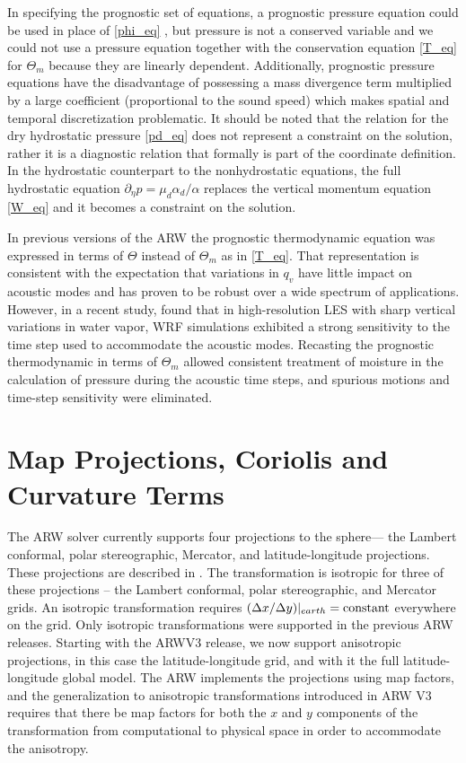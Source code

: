 In specifying the prognostic set of equations, a prognostic pressure equation could be used in
place of \eqref{phi_eq} \citep[see][]{laprise92}, but pressure is
not a conserved variable and we could not use a pressure equation
together with
the conservation equation \eqref{T_eq} for $\Theta_m$  because
they are linearly dependent.  
Additionally, prognostic pressure
equations have the disadvantage of possessing a mass divergence term
multiplied by a large coefficient (proportional to the sound speed)
which makes spatial and temporal discretization problematic.
It should be noted that the relation for the dry hydrostatic pressure
\eqref{pd_eq} does not represent a constraint on
the solution, rather it is a diagnostic relation that formally is part
of the coordinate definition.  In the hydrostatic counterpart to the
nonhydrostatic equations, the full hydrostatic equation $\partial_\eta p=\mu_d\alpha_d/\alpha$ replaces the
vertical momentum equation \eqref{W_eq} and it becomes a
constraint on the solution.

In previous versions of the ARW the prognostic thermodynamic equation was expressed in terms of $\Theta$ instead of $\Theta_m$ as in \eqref{T_eq}. That representation is consistent with the expectation that variations in $q_v$ have little impact on acoustic modes and has proven to be robust over a wide spectrum of applications. However, in a recent study, \citet{xiao15} found that in high-resolution LES with sharp vertical variations in water vapor, WRF simulations exhibited a strong sensitivity to the time step used to accommodate the acoustic modes. Recasting the prognostic thermodynamic in terms of $\Theta_m$ allowed consistent treatment of moisture in the calculation of pressure during the acoustic time steps, and spurious motions and time-step sensitivity were eliminated.


\section{Map Projections, Coriolis and Curvature Terms}
\label{spherical_projections}

The ARW solver currently supports four projections to the sphere--- the
Lambert conformal, polar stereographic, Mercator, and latitude-longitude
projections.  These projections are described in
\citet{haltiner_and_williams}.  The transformation is isotropic for
three of these projections -- the Lambert conformal, polar stereographic,
and Mercator grids.  An isotropic transformation requires $(\Delta
x/\Delta y)|_{earth} = \hbox{constant}$ everywhere on the grid.  Only
isotropic transformations were supported in the previous ARW releases.
Starting with the ARWV3 release, we now support anisotropic
projections, in this case the latitude-longitude grid, and with it the
full latitude-longitude global model.  The ARW implements the
projections using map factors, and the generalization to anisotropic
transformations introduced in ARW V3 requires that there be map factors
for both the $x$ and $y$ components of the transformation from
computational to physical space in order to accommodate the anisotropy.

